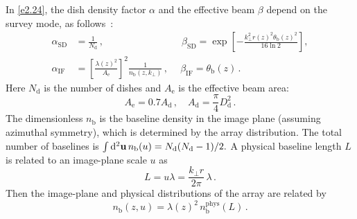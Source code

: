 In \eqref{e2.24}, the dish density factor $\alpha$ and the effective beam $\beta$ depend on the survey mode, as follows~\cite{Bull:2014rha, Obuljen:2017jiy, Ansari:2018ury, Jalilvand:2019bhk, Durrer:2020orn}:
\begin{align}
\alpha_\mathrm{SD} &= \frac{1}{N_\mathrm{d}}\,,\qquad\qquad\qquad\qquad  \beta_\mathrm{SD}= \exp\left[-\frac{k_\perp^2 r(z)^2\theta_{\mathrm b}(z)^2}{16\ln 2} \right], \label{sdn} \\
\alpha_\mathrm{IF} &=\left[ \frac{\lambda(z)^2}{A_{\mathrm e}}\right]^2 \frac{1}{n_{\mathrm b}(z,k_\perp)}
\,,\quad~  \beta_\mathrm{IF}= \theta_\mathrm{b}(z)\,. \label{ifn}
\end{align}
Here $N_\mathrm{d}$ is the number of dishes  and $A_\mathrm{e}$ is the effective beam area:
\begin{equation} \label{aeff}
A_\mathrm{e} = 0.7 A_\mathrm{d}\,, \quad A_\mathrm{d} = \frac{\pi}{4}D_\mathrm{d}^2\,.
\end{equation}
The dimensionless $n_\mathrm{b}$ is the baseline density in the image plane (assuming azimuthal symmetry), which is determined by the array distribution. {The total number of baselines is $\int \mathrm{d}^2{\textbf u}\,n_{\mathrm b}(u) = N_\mathrm{d}(N_\mathrm{d}-1)/2.$}
A physical baseline length $L$ is related to an image-plane scale $u$ as
\begin{equation}
L = u\lambda = \frac{k_\perp r}{ 2\pi}\,\lambda\,.
\end{equation}
Then the image-plane and physical distributions of the array are related by~\cite{Ansari:2018ury}
\begin{equation} \label{nbphy}
n_\mathrm{b}(z,u) = \lambda(z)^2\, n_\mathrm{b}^\mathrm{phys}(L)\,.
\end{equation}
























